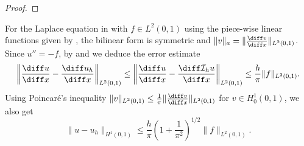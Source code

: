 \begin{proof}

\end{proof}

\begin{example}
    \label{ex:Galerkin Laplace piecewise linear error estimate}
    For the Laplace equation in  with $f \in L^2(0,1)$ using the piece-wise linear functions given by , the bilinear form is symmetric and $\|v\|_a = \|\frac{\diff v}{\diff x}\|_{L^2(0,1)}$. Since $u'' = -f$, by  and  we deduce the error estimate
    \[
        \left\| \frac{\diff u}{\diff x} - \frac{\diff u_h}{\diff x} \right\|_{L^2(0,1)} \le \left\| \frac{\diff u}{\diff x} - \frac{\diff \mathcal I_h u}{\diff x} \right\|_{L^2(0,1)} \leq \frac{h}{\pi} \|f\|_{L^2(0,1)}.
    \]
    Using Poincaré's inequality $\|v\|_{L^2(0,1)} \le \frac 1 \pi \|\frac{\diff v}{\diff x}\|_{L^2(0,1)}$ for $v \in H^1_0(0,1)$, we also get
    \[
        \|u - u_h\|_{H^1(0,1)} \leq \frac{h}{\pi} \left(1 + \frac{1}{\pi^2}\right)^{1/2} \|f\|_{L^2(0,1)}.
    \]
\end{example}

